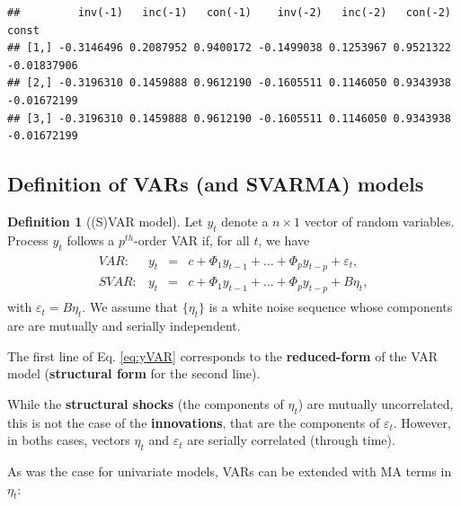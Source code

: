 \documentclass[
]{book}
\theoremstyle{definition}
\newtheorem{definition}{Definition}[chapter]
\theoremstyle{definition}
\theoremstyle{definition}
\theoremstyle{definition}
\theoremstyle{remark}
\begin{document}
\begin{verbatim}
##         inv(-1)   inc(-1)   con(-1)    inv(-2)   inc(-2)   con(-2)       const
## [1,] -0.3146496 0.2087952 0.9400172 -0.1499038 0.1253967 0.9521322 -0.01837906
## [2,] -0.3196310 0.1459888 0.9612190 -0.1605511 0.1146050 0.9343938 -0.01672199
## [3,] -0.3196310 0.1459888 0.9612190 -0.1605511 0.1146050 0.9343938 -0.01672199
\end{verbatim}

\hypertarget{definition-of-vars-and-svarma-models}{%
\subsection{Definition of VARs (and SVARMA) models}\label{definition-of-vars-and-svarma-models}}

\begin{definition}[(S)VAR model]
\protect\hypertarget{def:SVAR}{}\label{def:SVAR}Let \(y_{t}\) denote a \(n \times1\) vector of random variables. Process \(y_{t}\) follows a \(p^{th}\)-order VAR if, for all \(t\), we have
\begin{eqnarray}
\begin{array}{rllll}
VAR:& y_t &=& c + \Phi_1 y_{t-1} + \dots + \Phi_p y_{t-p} + \varepsilon_t,\\
SVAR:& y_t &=& c + \Phi_1 y_{t-1} + \dots + \Phi_p y_{t-p} + B \eta_t,
\end{array}\label{eq:yVAR}
\end{eqnarray}
with \(\varepsilon_t = B\eta_t\). We assume that \(\{\eta_{t}\}\) is a white noise sequence whose components are are mutually and serially independent.
\end{definition}

The first line of Eq. \eqref{eq:yVAR} corresponds to the \textbf{reduced-form} of the VAR model (\textbf{structural form} for the second line).

While the \textbf{structural shocks} (the components of \(\eta_t\)) are mutually uncorrelated, this is not the case of the \textbf{innovations}, that are the components of \(\varepsilon_t\). However, in boths cases, vectors \(\eta_t\) and \(\varepsilon_t\) are serially correlated (through time).

As was the case for univariate models, VARs can be extended with MA terms in \(\eta_t\):
\end{document}
